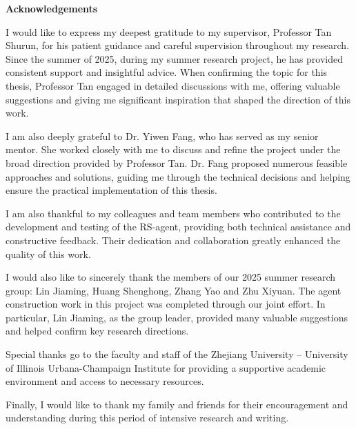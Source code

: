 \clearpage
\centerline{\xiaoyi\bfseries Acknowledgements}
\vspace{2em}

\noindent
{} %
{\fontsize{12pt}{14pt}\selectfont
	
	I would like to express my deepest gratitude to my supervisor, Professor Tan Shurun, for his patient guidance and careful supervision throughout my research. Since the summer of 2025, during my summer research project, he has provided consistent support and insightful advice. When confirming the topic for this thesis, Professor Tan engaged in detailed discussions with me, offering valuable suggestions and giving me significant inspiration that shaped the direction of this work.
	
	I am also deeply grateful to Dr. Yiwen Fang, who has served as my senior mentor. She worked closely with me to discuss and refine the project under the broad direction provided by Professor Tan. Dr. Fang proposed numerous feasible approaches and solutions, guiding me through the technical decisions and helping ensure the practical implementation of this thesis.
	
	I am also thankful to my colleagues and team members who contributed to the development and testing of the RS-agent, providing both technical assistance and constructive feedback. Their dedication and collaboration greatly enhanced the quality of this work.
	
	I would also like to sincerely thank the members of our 2025 summer research group: Lin Jiaming, Huang Shenghong, Zhang Yao and Zhu Xiyuan. The agent construction work in this project was completed through our joint effort. In particular, Lin Jiaming, as the group leader, provided many valuable suggestions and helped confirm key research directions.
	
	Special thanks go to the faculty and staff of the Zhejiang University – University of Illinois Urbana-Champaign Institute for providing a supportive academic environment and access to necessary resources. 
	
	Finally, I would like to thank my family and friends for their encouragement and understanding during this period of intensive research and writing.
}